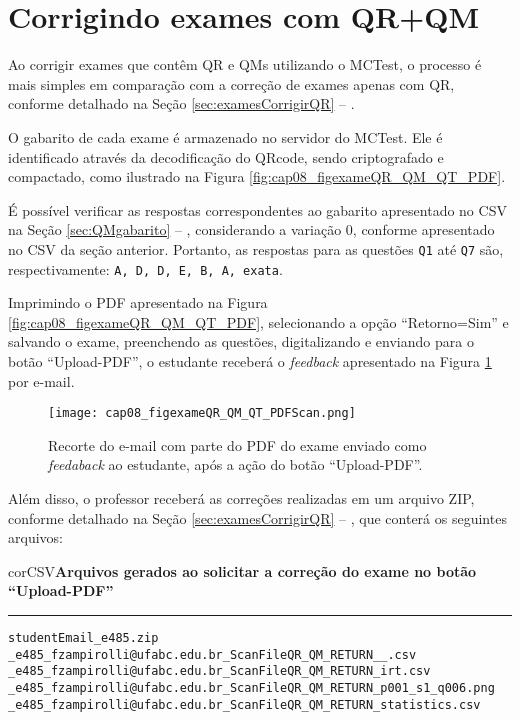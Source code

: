 \section{Corrigindo exames com QR+QM}


Ao corrigir exames que contêm QR e QMs utilizando o MCTest, o processo é mais simples em comparação com a correção de exames apenas com QR, conforme detalhado na Seção \ref{sec:examesCorrigirQR} -- .

O gabarito de cada exame é armazenado no servidor do MCTest. Ele é identificado através da decodificação do QRcode, sendo criptografado e compactado, como ilustrado na Figura \ref{fig:cap08_figexameQR_QM_QT_PDF}.

É possível verificar as respostas correspondentes ao gabarito apresentado no CSV na Seção \ref{sec:QMgabarito} -- , considerando a variação 0, conforme apresentado no CSV da seção anterior. Portanto, as respostas para as questões \verb|Q1| até \verb|Q7| são, respectivamente: \verb|A, D, D, E, B, A, exata|.

Imprimindo o PDF apresentado na Figura \ref{fig:cap08_figexameQR_QM_QT_PDF}, selecionando a opção ``Retorno=Sim'' e salvando o exame, preenchendo as questões, digitalizando e enviando para o botão ``Upload-PDF'',  o estudante receberá o \textit{feedback} apresentado na Figura \ref{fig:cap08_figexameQR_QM_QT_PDFScan} por e-mail.


\begin{figure}[!ht]
  \centering
  \texttt{[image: cap08\_figexameQR\_QM\_QT\_PDFScan.png]}
   \caption{Recorte do e-mail com parte do PDF do exame enviado como \textit{feedaback} ao estudante, após a ação do botão ``Upload-PDF''.}
\label{fig:cap08_figexameQR_QM_QT_PDFScan} 
\end{figure}

Além disso, o professor receberá as correções realizadas em um arquivo ZIP, conforme detalhado na Seção \ref{sec:examesCorrigirQR} -- , que conterá os seguintes arquivos:
 
\begin{myboxCode}{corCSV}{\textbf{Arquivos gerados ao solicitar a correção do exame no botão ``Upload-PDF''}}\vspace{3mm}
\hrule
\begin{verbatim}
studentEmail_e485.zip
_e485_fzampirolli@ufabc.edu.br_ScanFileQR_QM_RETURN__.csv
_e485_fzampirolli@ufabc.edu.br_ScanFileQR_QM_RETURN_irt.csv
_e485_fzampirolli@ufabc.edu.br_ScanFileQR_QM_RETURN_p001_s1_q006.png
_e485_fzampirolli@ufabc.edu.br_ScanFileQR_QM_RETURN_statistics.csv
\end{verbatim}
\end{myboxCode}

